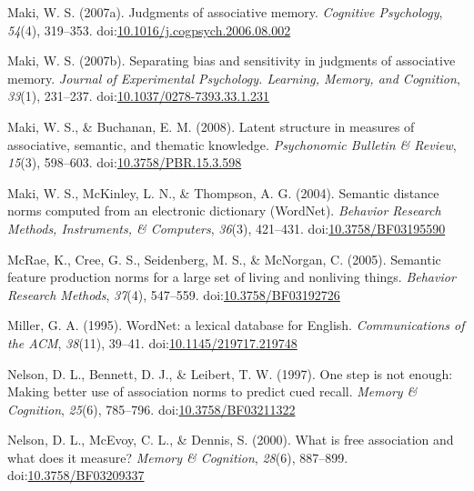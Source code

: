 \documentclass[english,,man]{apa6}
\begin{document}
\leavevmode\hypertarget{ref-Maki2007a}{}%
Maki, W. S. (2007a). Judgments of associative memory. \emph{Cognitive Psychology}, \emph{54}(4), 319--353. doi:\href{https://doi.org/10.1016/j.cogpsych.2006.08.002}{10.1016/j.cogpsych.2006.08.002}

\leavevmode\hypertarget{ref-Maki2007}{}%
Maki, W. S. (2007b). Separating bias and sensitivity in judgments of associative memory. \emph{Journal of Experimental Psychology. Learning, Memory, and Cognition}, \emph{33}(1), 231--237. doi:\href{https://doi.org/10.1037/0278-7393.33.1.231}{10.1037/0278-7393.33.1.231}

\leavevmode\hypertarget{ref-Maki2008}{}%
Maki, W. S., \& Buchanan, E. M. (2008). Latent structure in measures of associative, semantic, and thematic knowledge. \emph{Psychonomic Bulletin \& Review}, \emph{15}(3), 598--603. doi:\href{https://doi.org/10.3758/PBR.15.3.598}{10.3758/PBR.15.3.598}

\leavevmode\hypertarget{ref-Maki2004}{}%
Maki, W. S., McKinley, L. N., \& Thompson, A. G. (2004). Semantic distance norms computed from an electronic dictionary (WordNet). \emph{Behavior Research Methods, Instruments, \& Computers}, \emph{36}(3), 421--431. doi:\href{https://doi.org/10.3758/BF03195590}{10.3758/BF03195590}

\leavevmode\hypertarget{ref-McRae2005}{}%
McRae, K., Cree, G. S., Seidenberg, M. S., \& McNorgan, C. (2005). Semantic feature production norms for a large set of living and nonliving things. \emph{Behavior Research Methods}, \emph{37}(4), 547--559. doi:\href{https://doi.org/10.3758/BF03192726}{10.3758/BF03192726}

\leavevmode\hypertarget{ref-Miller1995}{}%
Miller, G. A. (1995). WordNet: a lexical database for English. \emph{Communications of the ACM}, \emph{38}(11), 39--41. doi:\href{https://doi.org/10.1145/219717.219748}{10.1145/219717.219748}

\leavevmode\hypertarget{ref-Nelson1997}{}%
Nelson, D. L., Bennett, D. J., \& Leibert, T. W. (1997). One step is not enough: Making better use of association norms to predict cued recall. \emph{Memory \& Cognition}, \emph{25}(6), 785--796. doi:\href{https://doi.org/10.3758/BF03211322}{10.3758/BF03211322}

\leavevmode\hypertarget{ref-Nelson2000}{}%
Nelson, D. L., McEvoy, C. L., \& Dennis, S. (2000). What is free association and what does it measure? \emph{Memory \& Cognition}, \emph{28}(6), 887--899. doi:\href{https://doi.org/10.3758/BF03209337}{10.3758/BF03209337}
\end{document}
